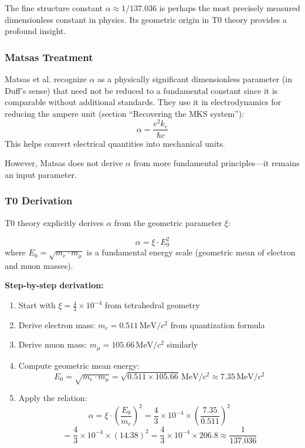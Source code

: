 	The fine structure constant $\alpha \approx 1/137.036$ is perhaps the most precisely measured dimensionless constant in physics. Its geometric origin in T0 theory provides a profound insight.
	
	\subsubsection{Matsas Treatment}
	
	Matsas et al. recognize $\alpha$ as a physically significant dimensionless parameter (in Duff's sense) that need not be reduced to a fundamental constant since it is comparable without additional standards. They use it in electrodynamics for reducing the ampere unit (section ``Recovering the MKS system''):
	\[
	\alpha = \frac{e^2 k_e}{\hbar c}
	\]
	This helps convert electrical quantities into mechanical units.
	
	However, Matsas does not derive $\alpha$ from more fundamental principles—it remains an input parameter.
	
	\subsubsection{T0 Derivation}
	
	T0 theory explicitly derives $\alpha$ from the geometric parameter $\xi$:
	
	\begin{keyresult}
		\[
		\alpha = \xi \cdot E_0^2
		\]
		where $E_0 = \sqrt{m_e \cdot m_\mu}$ is a fundamental energy scale (geometric mean of electron and muon masses).
	\end{keyresult}
	
	\textbf{Step-by-step derivation:}
	
	\begin{enumerate}
		\item Start with $\xi = \frac{4}{3} \times 10^{-4}$ from tetrahedral geometry
		
		\item Derive electron mass: $m_e = 0.511\,\text{MeV}/c^2$ from quantization formula
		
		\item Derive muon mass: $m_\mu = 105.66\,\text{MeV}/c^2$ similarly
		
		\item Compute geometric mean energy:
		\[
		E_0 = \sqrt{m_e \cdot m_\mu} = \sqrt{0.511 \times 105.66}\,\text{MeV}/c^2 \approx 7.35\,\text{MeV}/c^2
		\]
		
		\item Apply the relation:
		\[
		\alpha = \xi \cdot \left(\frac{E_0}{m_e}\right)^2 = \frac{4}{3} \times 10^{-4} \times \left(\frac{7.35}{0.511}\right)^2
		\]
		\[
		= \frac{4}{3} \times 10^{-4} \times (14.38)^2 = \frac{4}{3} \times 10^{-4} \times 206.8 \approx \frac{1}{137.036}
		\]
	\end{enumerate}
	
